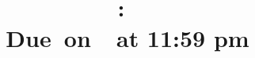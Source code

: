 \documentclass{article}
\title {
  \vspace{2in}
  \textmd{\textbf{\hmwkClass:\ \hmwkTitle}}\\
  \normalsize\vspace{0.1in}\small{Due\ on\ \hmwkDueDate\ at 11:59 pm} \\
  \vspace{0.1in}\large{\textit{\hmwkClassInstructor\ \hmwkClassTime}}
  \vspace{3in}
}
\author{\hmwkAuthorName}
\date{}
\begin{document}
  \maketitle

  \pagebreak

\end{document}
